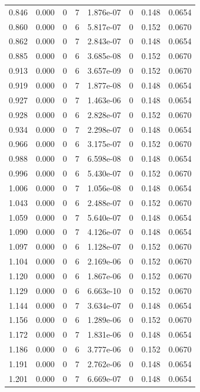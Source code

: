 \documentclass[preview]{standalone}
\begin{document}
{{{\begin{tabular}{L{1.2cm}C{1.2cm} C{0.3cm}C{0.5cm} C{1.4cm}C{1.4cm} C{1.4cm}C{1.4cm}}
  0.846  &  0.000  & 0     &  7 &  1.876e-07  & 0  & 0.148 &  0.0654   \\ 
  0.860  &  0.000  & 0     &  6 &  5.817e-07  & 0  & 0.152 &  0.0670   \\ 
  0.862  &  0.000  & 0     &  7 &  2.843e-07  & 0  & 0.148 &  0.0654   \\ 
  0.885  &  0.000  & 0     &  6 &  3.685e-08  & 0  & 0.152 &  0.0670   \\ 
  0.913  &  0.000  & 0     &  6 &  3.657e-09  & 0  & 0.152 &  0.0670   \\ 
  0.919  &  0.000  & 0     &  7 &  1.877e-08  & 0  & 0.148 &  0.0654   \\ 
  0.927  &  0.000  & 0     &  7 &  1.463e-06  & 0  & 0.148 &  0.0654   \\ 
  0.928  &  0.000  & 0     &  6 &  2.828e-07  & 0  & 0.152 &  0.0670   \\ 
  0.934  &  0.000  & 0     &  7 &  2.298e-07  & 0  & 0.148 &  0.0654   \\ 
  0.966  &  0.000  & 0     &  6 &  3.175e-07  & 0  & 0.152 &  0.0670   \\ 
  0.988  &  0.000  & 0     &  7 &  6.598e-08  & 0  & 0.148 &  0.0654   \\ 
  0.996  &  0.000  & 0     &  6 &  5.430e-07  & 0  & 0.152 &  0.0670   \\ 
  1.006  &  0.000  & 0     &  7 &  1.056e-08  & 0  & 0.148 &  0.0654   \\ 
  1.043  &  0.000  & 0     &  6 &  2.488e-07  & 0  & 0.152 &  0.0670   \\ 
  1.059  &  0.000  & 0     &  7 &  5.640e-07  & 0  & 0.148 &  0.0654   \\ 
  1.090  &  0.000  & 0     &  7 &  4.126e-07  & 0  & 0.148 &  0.0654   \\ 
  1.097  &  0.000  & 0     &  6 &  1.128e-07  & 0  & 0.152 &  0.0670   \\ 
  1.104  &  0.000  & 0     &  6 &  2.169e-06  & 0  & 0.152 &  0.0670   \\ 
  1.120  &  0.000  & 0     &  6 &  1.867e-06  & 0  & 0.152 &  0.0670   \\ 
  1.129  &  0.000  & 0     &  6 &  6.663e-10  & 0  & 0.152 &  0.0670   \\ 
  1.144  &  0.000  & 0     &  7 &  3.634e-07  & 0  & 0.148 &  0.0654   \\ 
  1.156  &  0.000  & 0     &  6 &  1.289e-06  & 0  & 0.152 &  0.0670   \\ 
  1.172  &  0.000  & 0     &  7 &  1.831e-06  & 0  & 0.148 &  0.0654   \\ 
  1.186  &  0.000  & 0     &  6 &  3.777e-06  & 0  & 0.152 &  0.0670   \\ 
  1.191  &  0.000  & 0     &  7 &  2.762e-06  & 0  & 0.148 &  0.0654   \\ 
  1.201  &  0.000  & 0     &  7 &  6.669e-07  & 0  & 0.148 &  0.0654   \\ 
\hline 
\end{tabular} 

}}}
\end{document}
